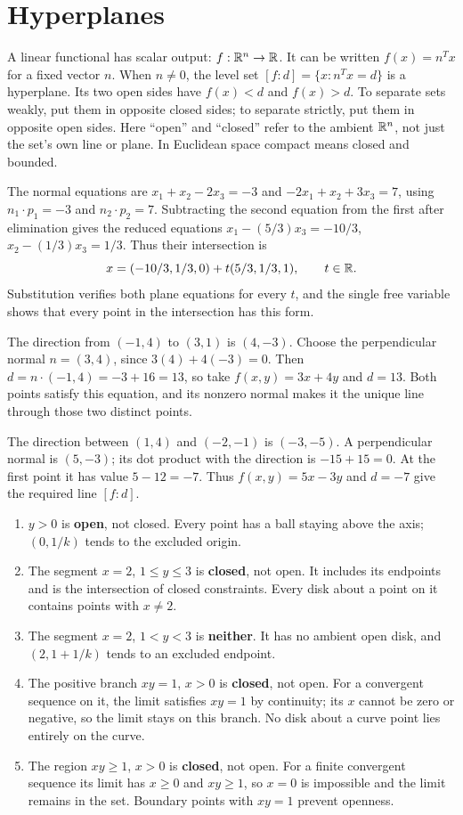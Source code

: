 \section{Hyperplanes}
A linear functional has scalar output: $f:\mathbb{R}^n\to\mathbb{R}$.
It can be written $f(x)=n^Tx$ for a fixed vector $n$. When $n\ne0$,
the level set $[f:d]=\{x:n^Tx=d\}$ is a hyperplane.
Its two open sides have $f(x)<d$ and $f(x)>d$.
To separate sets weakly, put them in opposite closed sides; to separate
strictly, put them in opposite open sides.
Here ``open'' and ``closed'' refer to the ambient $\mathbb{R}^n$, not just the
set's own line or plane. In Euclidean space compact means closed and bounded.

The normal equations are $x_1+x_2-2x_3=-3$ and
$-2x_1+x_2+3x_3=7$, using $n_1\cdot p_1=-3$ and $n_2\cdot p_2=7$.
Subtracting the second equation from the first after elimination gives
the reduced equations
$x_1-(5/3)x_3=-10/3$, $x_2-(1/3)x_3=1/3$.
Thus their intersection is
\[
 x=(-10/3,1/3,0)+t(5/3,1/3,1),\qquad t\in\mathbb{R}.
\]
Substitution verifies both plane equations for every $t$, and the single
free variable shows that every point in the intersection has this form.

The direction from $(-1,4)$ to $(3,1)$ is $(4,-3)$.
Choose the perpendicular normal $n=(3,4)$, since $3(4)+4(-3)=0$.
Then $d=n\cdot(-1,4)=-3+16=13$, so take
$f(x,y)=3x+4y$ and $d=13$.
Both points satisfy this equation, and its nonzero normal makes it the
unique line through those two distinct points.

The direction between $(1,4)$ and $(-2,-1)$ is $(-3,-5)$.
A perpendicular normal is $(5,-3)$; its dot product with the direction is
$-15+15=0$. At the first point it has value $5-12=-7$.
Thus $f(x,y)=5x-3y$ and $d=-7$ give the required line $[f:d]$.

\begin{enumerate}[label=(\alph*)]
\item $y>0$ is \textbf{open}, not closed. Every point has a ball staying
above the axis; $(0,1/k)$ tends to the excluded origin.
\item The segment $x=2$, $1\le y\le3$ is \textbf{closed}, not open.
It includes its endpoints and is the intersection of closed constraints.
Every disk about a point on it contains points with $x\ne2$.
\item The segment $x=2$, $1<y<3$ is \textbf{neither}. It has no ambient
open disk, and $(2,1+1/k)$ tends to an excluded endpoint.
\item The positive branch $xy=1$, $x>0$ is \textbf{closed}, not open.
For a convergent sequence on it, the limit satisfies $xy=1$ by continuity;
its $x$ cannot be zero or negative, so the limit stays on this branch.
No disk about a curve point lies entirely on the curve.
\item The region $xy\ge1$, $x>0$ is \textbf{closed}, not open.
For a finite convergent sequence its limit has $x\ge0$ and $xy\ge1$,
so $x=0$ is impossible and the limit remains in the set. Boundary points
with $xy=1$ prevent openness.
\end{enumerate}

